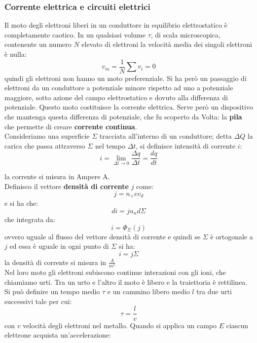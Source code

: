 \documentclass[a4paper,12pt, oneside]{book}
\begin{document}
\subsubsection{Corrente elettrica e circuiti elettrici}
Il moto degli elettroni liberi in un conduttore in equilibrio elettrostatico è completamente caotico. In un qualsiasi volume $\tau$, di scala microscopica, contenente un numero $N$ elevato di elettroni la velocità media dei singoli elettroni è nulla:
$$v_m=\frac{1}{N}\sum v_i=0$$
quindi gli elettroni non hanno un moto preferenziale. Si ha però un passaggio di elettroni da un conduttore a potenziale minore rispetto ad uno a potenziale maggiore, sotto azione del campo elettrostatico e dovuto alla differenza di potenziale. Questo moto costituisce la corrente elettrica. Serve però un dispositivo che mantenga questa differenza di potenziale, che fu scoperto da Volta: la \textbf{pila} che permette di creare \textbf{corrente continua}. \\
Consideriamo una superficie $\Sigma$ tracciata all'interno di un conduttore; detta $\Delta Q$ la carica che passa attraverso $\Sigma$ nel tempo $\Delta t$, si definisce intensità di corrente $i$:
$$i=\lim_{\Delta t\to 0}\frac{\Delta q}{\Delta t}=\frac{dq}{dt}$$

la corrente si misura in Ampere A.\\
Definisco il vettore \textbf{densità di corrente} $j$ come:
$$j=n_+ev_d$$
e si ha che:
$$di=ju_nd\Sigma$$
che integrata da:
$$i=\Phi_\Sigma(j)$$
ovvero uguale al flusso del vettore densità di corrente e quindi se $\Sigma$ è ortogonale a $j$ ed essa è uguale in ogni punto di $\Sigma$ si ha:
$$i=j\Sigma$$
la densità di corrente si misura in $\frac{A}{m^2}$
\\
Nel loro moto gli elettroni subiscono continue interazioni con gli ioni, che chiamiamo urti. Tra un urto e l'altro il moto è libero e la traiettoria è rettilinea. Si può definire un tempo medio $\tau$ e un cammino libero medio $l$ tra due urti successivi tale per cui:
$$\tau=\frac{l}{v}$$
con $v$ velocità degli elettroni nel metallo. Quando si applica un campo $E$ ciascun elettrone acquista un'accelerazione:
\end{document}
